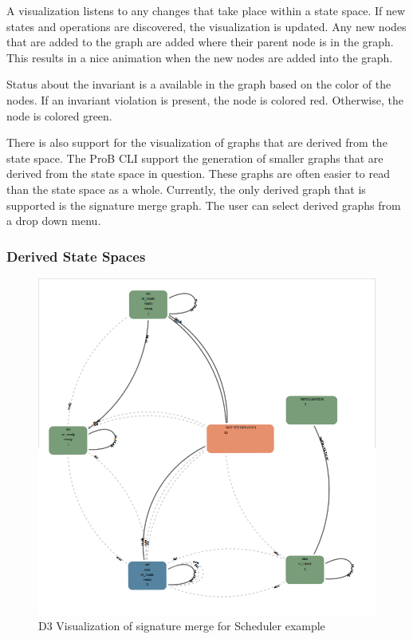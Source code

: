 A visualization listens to any changes that take place within a state space. If new states and operations are discovered, the visualization is updated. Any new nodes that are added to the graph are added where their parent node is in the graph. This results in a nice animation when the new nodes are added into the graph.

Status about the invariant is a available in the graph based on the color of the nodes. If an invariant violation is present, the node is colored red. Otherwise, the node is colored green.

There is also support for the visualization of graphs that are derived from the state space. The ProB CLI support the generation of smaller graphs that are derived from the state space in question. These graphs are often easier to read than the state space as a whole. Currently, the only derived graph that is supported is the signature merge graph. The user can select derived graphs from a drop down menu.

\subsubsection{Derived State Spaces}

\begin{figure}[h!]
\centering
\includegraphics[width=15cm]{bilder/sigmerge.png}
\caption{D3 Visualization of signature merge for Scheduler example}
\label{sigmerge}
\end{figure}

